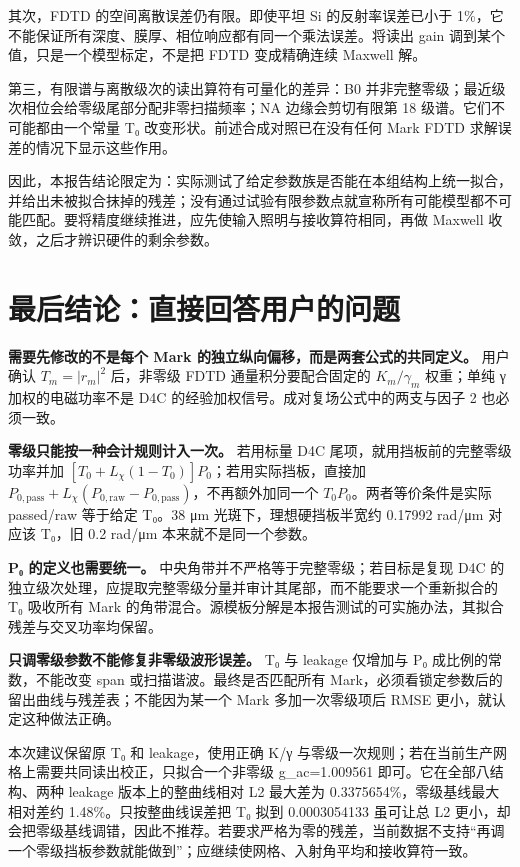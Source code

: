 \documentclass[
  chinese,
  UTF8,
  a4paper,
  11pt]{ctexart}
\begin{document}
其次，FDTD 的空间离散误差仍有限。即使平坦 Si 的反射率误差已小于
1\%，它不能保证所有深度、膜厚、相位响应都有同一个乘法误差。将读出 gain
调到某个值，只是一个模型标定，不是把 FDTD 变成精确连续 Maxwell 解。

第三，有限谱与离散级次的读出算符有可量化的差异：B0
并非完整零级；最近级次相位会给零级尾部分配非零扫描频率；NA
边缘会剪切有限第 18 级谱。它们不可能都由一个常量 T₀
改变形状。前述合成对照已在没有任何 Mark FDTD
求解误差的情况下显示这些作用。

因此，本报告结论限定为：实际测试了给定参数族是否能在本组结构上统一拟合，并给出未被拟合抹掉的残差；没有通过试验有限参数点就宣称所有可能模型都不可能匹配。要将精度继续推进，应先使输入照明与接收算符相同，再做
Maxwell 收敛，之后才辨识硬件的剩余参数。

\section{最后结论：直接回答用户的问题}\label{ux6700ux540eux7ed3ux8bbaux76f4ux63a5ux56deux7b54ux7528ux6237ux7684ux95eeux9898}

\textbf{需要先修改的不是每个 Mark
的独立纵向偏移，而是两套公式的共同定义。} 用户确认 \(T_m=|r_m|^2\)
后，非零级 FDTD 通量积分要配合固定的 \(K_m/\gamma_m\) 权重；单纯 γ
加权的电磁功率不是 D4C 的经验加权信号。成对复场公式中的两支与因子 2
也必须一致。

\textbf{零级只能按一种会计规则计入一次。} 若用标量 D4C
尾项，就用挡板前的完整零级功率并加
\([T_0+L_\chi(1-T_0)]P_0\)；若用实际挡板，直接加
\(P_{0,\mathrm{pass}}+L_\chi(P_{0,\mathrm{raw}}-P_{0,\mathrm{pass}})\)，不再额外加同一个
\(T_0P_0\)。两者等价条件是实际 passed/raw 等于给定 T₀。38 μm
光斑下，理想硬挡板半宽约 0.17992 rad/μm 对应该 T₀，旧 0.2 rad/μm
本来就不是同一个参数。

\textbf{P₀ 的定义也需要统一。}
中央角带并不严格等于完整零级；若目标是复现 D4C
的独立级次处理，应提取完整零级分量并审计其尾部，而不能要求一个重新拟合的
T₀ 吸收所有 Mark
的角带混合。源模板分解是本报告测试的可实施办法，其拟合残差与交叉功率均保留。

\textbf{只调零级参数不能修复非零级波形误差。} T₀ 与 leakage 仅增加与 P₀
成比例的常数，不能改变 span 或扫描谐波。最终是否匹配所有
Mark，必须看锁定参数后的留出曲线与残差表；不能因为某一个 Mark
多加一次零级项后 RMSE 更小，就认定这种做法正确。

本次建议保留原 T₀ 和 leakage，使用正确 K/γ
与零级一次规则；若在当前生产网格上需要共同读出校正，只拟合一个非零级
g\_ac=1.009561 即可。它在全部八结构、两种 leakage 版本上的整曲线相对 L2
最大差为 0.3375654\%，零级基线最大相对差约 1.48\%。只按整曲线误差把 T₀
拟到 0.0003054133 虽可让总 L2
更小，却会把零级基线调错，因此不推荐。若要求严格为零的残差，当前数据不支持``再调一个零级挡板参数就能做到''；应继续使网格、入射角平均和接收算符一致。
\end{document}
